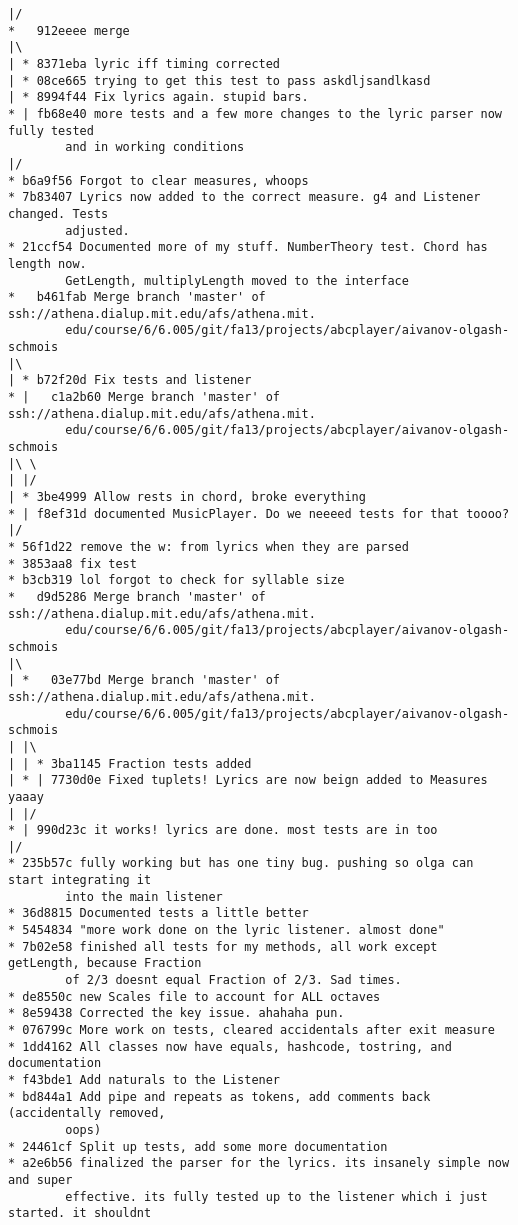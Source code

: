 \documentclass[12pt]{book}
\begin{document}
\begin{Verbatim}
|/
*   912eeee merge
|\
| * 8371eba lyric iff timing corrected
| * 08ce665 trying to get this test to pass askdljsandlkasd
| * 8994f44 Fix lyrics again. stupid bars.
* | fb68e40 more tests and a few more changes to the lyric parser now fully tested 
        and in working conditions
|/
* b6a9f56 Forgot to clear measures, whoops
* 7b83407 Lyrics now added to the correct measure. g4 and Listener changed. Tests 
        adjusted.
* 21ccf54 Documented more of my stuff. NumberTheory test. Chord has length now. 
        GetLength, multiplyLength moved to the interface
*   b461fab Merge branch 'master' of ssh://athena.dialup.mit.edu/afs/athena.mit.
        edu/course/6/6.005/git/fa13/projects/abcplayer/aivanov-olgash-schmois
|\
| * b72f20d Fix tests and listener
* |   c1a2b60 Merge branch 'master' of ssh://athena.dialup.mit.edu/afs/athena.mit.
        edu/course/6/6.005/git/fa13/projects/abcplayer/aivanov-olgash-schmois
|\ \
| |/
| * 3be4999 Allow rests in chord, broke everything
* | f8ef31d documented MusicPlayer. Do we neeeed tests for that toooo?
|/
* 56f1d22 remove the w: from lyrics when they are parsed
* 3853aa8 fix test
* b3cb319 lol forgot to check for syllable size
*   d9d5286 Merge branch 'master' of ssh://athena.dialup.mit.edu/afs/athena.mit.
        edu/course/6/6.005/git/fa13/projects/abcplayer/aivanov-olgash-schmois
|\
| *   03e77bd Merge branch 'master' of ssh://athena.dialup.mit.edu/afs/athena.mit.
        edu/course/6/6.005/git/fa13/projects/abcplayer/aivanov-olgash-schmois
| |\
| | * 3ba1145 Fraction tests added
| * | 7730d0e Fixed tuplets! Lyrics are now beign added to Measures yaaay
| |/
* | 990d23c it works! lyrics are done. most tests are in too
|/
* 235b57c fully working but has one tiny bug. pushing so olga can start integrating it 
        into the main listener
* 36d8815 Documented tests a little better
* 5454834 "more work done on the lyric listener. almost done"
* 7b02e58 finished all tests for my methods, all work except getLength, because Fraction 
        of 2/3 doesnt equal Fraction of 2/3. Sad times.
* de8550c new Scales file to account for ALL octaves
* 8e59438 Corrected the key issue. ahahaha pun.
* 076799c More work on tests, cleared accidentals after exit measure
* 1dd4162 All classes now have equals, hashcode, tostring, and documentation
* f43bde1 Add naturals to the Listener
* bd844a1 Add pipe and repeats as tokens, add comments back (accidentally removed, 
        oops)
* 24461cf Split up tests, add some more documentation
* a2e6b56 finalized the parser for the lyrics. its insanely simple now and super 
        effective. its fully tested up to the listener which i just started. it shouldnt 

\end{Verbatim}
\end{document}
